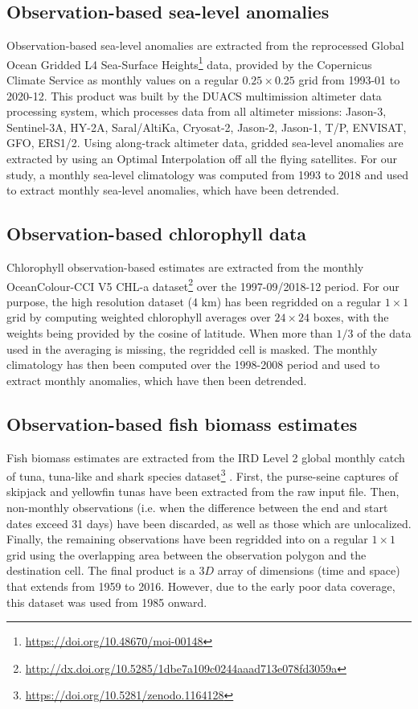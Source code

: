 \subsection{Observation-based sea-level anomalies}
\label{sec:ssh}

Observation-based sea-level anomalies are extracted from the reprocessed Global Ocean Gridded L4 Sea-Surface Heights\footnote{\url{https://doi.org/10.48670/moi-00148}} data, provided by the Copernicus Climate Service as monthly values on a regular $0.25 \times 0.25$ grid from 1993-01 to 2020-12. This product was built by the DUACS multimission altimeter data processing system, which processes data from all altimeter missions: Jason-3, Sentinel-3A, HY-2A, Saral/AltiKa, Cryosat-2, Jason-2, Jason-1, T/P, ENVISAT, GFO, ERS1/2. Using along-track altimeter data, gridded sea-level anomalies are extracted by using an Optimal Interpolation off all the flying satellites. For our study, a monthly sea-level climatology was computed from 1993 to 2018 and used to extract monthly sea-level anomalies, which have been detrended.

\subsection{Observation-based chlorophyll data}
\label{sec:chl}

Chlorophyll observation-based estimates are extracted from the monthly OceanColour-CCI V5 CHL-a dataset\footnote{\url{http://dx.doi.org/10.5285/1dbe7a109c0244aaad713e078fd3059a}} \citep{sathyendranathOceanColourTimeSeries2019} over the 1997-09/2018-12 period. For our purpose, the high resolution dataset (4 km) has been regridded on a regular $1\times 1$ grid by computing weighted chlorophyll averages over $24\times24$ boxes, with the weights being provided by the cosine of latitude. When more than $1/3$ of the data used in the averaging is missing, the regridded cell is masked. The monthly climatology has then been computed over the 1998-2008 period and used to extract monthly anomalies, which have then been detrended.

\subsection{Observation-based fish biomass estimates}
\label{sec:fish}

Fish biomass estimates are extracted from the IRD Level 2 global monthly catch of tuna, tuna-like and shark species dataset\footnote{\url{https://doi.org/10.5281/zenodo.1164128}} \citep{taconetGlobalMonthlyCatch2018}. First, the purse-seine captures of skipjack and yellowfin tunas have been extracted from the raw input file. Then, non-monthly observations (i.e. when the difference between the end and start dates exceed 31 days) have been discarded, as well as those which are unlocalized. Finally, the remaining observations have been regridded into on a regular $1 \times 1$ grid using the overlapping area between the observation polygon and the destination cell. The final product is a $3D$ array of dimensions (time and space) that extends from 1959 to 2016. However, due to the early poor data coverage, this dataset was used from 1985 onward.

